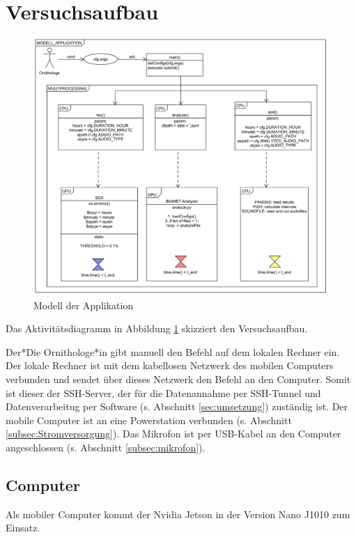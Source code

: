 \section{Versuchsaufbau}
\label{sec:versuchsaufbau}

\begin{figure}
    \centering
    \includegraphics[width=1\linewidth]{bilder/modell_app_2.png}
 \caption{Modell der Applikation}
    \label{fig:versuchsaufbau}
\end{figure}

Das Aktivitätsdiagramm in Abbildung \ref{fig:versuchsaufbau} skizziert den Versuchsaufbau. 

Der*Die Ornithologe*in gibt manuell den Befehl auf dem lokalen Rechner ein. Der lokale Rechner ist mit dem kabellosen Netzwerk des mobilen Computers verbunden und sendet über dieses Netzwerk den Befehl an den Computer. Somit ist dieser der SSH-Server, der für die Datenannahme per SSH-Tunnel und Datenverarbeitug per Software (s. Abschnitt \ref{sec:umsetzung}) zuständig ist. Der mobile Computer ist an eine Powerstation verbunden (s. Abschnitt \ref{subsec:Stromversorgung}). Das Mikrofon ist per USB-Kabel an den Computer angeschlossen (s. Abschnitt \ref{subsec:mikrofon}).


\subsection{Computer \label{subsec:Computer}}
Als mobiler Computer kommt der Nvidia Jetson in der Version Nano J1010 zum Einsatz. 

